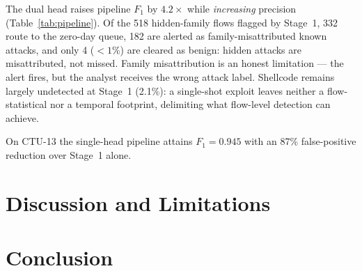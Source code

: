 \documentclass[journal]{IEEEtran}
\begin{document}
The dual head raises pipeline $F_1$ by $4.2\times$ while \emph{increasing}
precision (Table~\ref{tab:pipeline}). Of the 518 hidden-family flows flagged
by Stage~1, 332 route to the zero-day queue, 182 are alerted as
family-misattributed known attacks, and only 4 ($<1\%$) are cleared as benign:
hidden attacks are misattributed, not missed. Family misattribution is an
honest limitation --- the alert fires, but the analyst receives the wrong
attack label. Shellcode remains largely undetected at Stage~1 (2.1\%): a
single-shot exploit leaves neither a flow-statistical nor a temporal
footprint, delimiting what flow-level detection can achieve.

On CTU-13 the single-head pipeline attains $F_1=0.945$ with an 87\%
false-positive reduction over Stage~1 alone.

\section{Discussion and Limitations}\label{sec:discussion}

\section{Conclusion}\label{sec:conclusion}
\end{document}
